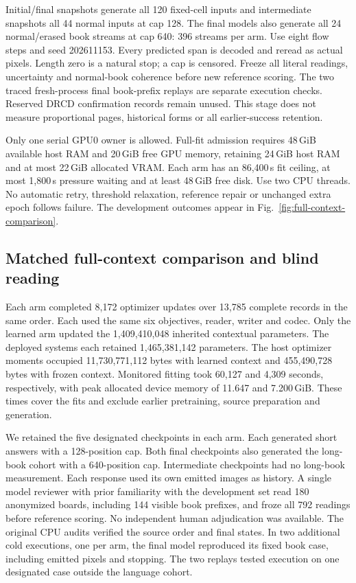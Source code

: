 \documentclass[12pt,a4paper]{article}
\providecommand{\DIFadd}[1]{{\protect\color{blue} \sf #1}} %
\begin{document}
\DIFadd{Initial/final snapshots generate all 120 fixed-cell inputs and intermediate
snapshots all 44 normal inputs at cap 128. The final models also generate all
24 normal/erased book streams at cap 640: 396 streams per arm. Use eight flow
steps and seed 202611153. Every predicted span is decoded and reread as actual
pixels. Length zero is a natural stop; a cap is censored. Freeze all literal
readings, uncertainty and normal-book coherence before new reference scoring.
The two traced fresh-process final book-prefix replays are separate execution
checks. Reserved DRCD confirmation records remain unused. This stage does not
measure proportional pages, historical forms or all earlier-success retention.
}

\DIFadd{Only one serial GPU0 owner is allowed. Full-fit admission requires 48\,GiB
available host RAM and 20\,GiB free GPU memory, retaining 24\,GiB host RAM and
at most 22\,GiB allocated VRAM. Each arm has an 86,400\,s fit ceiling, at most
1,800\,s pressure waiting and at least 48\,GiB free disk. Use two CPU threads.
No automatic retry, threshold relaxation, reference repair or unchanged extra
epoch follows failure. The development outcomes appear in Fig.~\ref{fig:full-context-comparison}.
}

\subsection*{\DIFadd{Matched full-context comparison and blind reading}}
\DIFadd{Each arm completed 8,172 optimizer updates over 13,785 complete records in
the same order. Each used the same six objectives, reader, writer and codec.
Only the learned arm updated the 1,409,410,048 inherited contextual parameters.
The deployed systems each retained 1,465,381,142 parameters. The host optimizer
moments occupied 11,730,771,112 bytes with learned context and 455,490,728 bytes
with frozen context. Monitored fitting took 60,127 and 4,309 seconds, respectively,
with peak allocated device memory of 11.647 and 7.200\,GiB. These times cover
the fits and exclude earlier pretraining, source preparation and generation.
}

\DIFadd{We retained the five designated checkpoints in each arm. Each generated short
answers with a 128-position cap. Both final checkpoints also generated the
long-book cohort with a 640-position cap. Intermediate checkpoints had no
long-book measurement. Each response used its own emitted images as history.
A single model reviewer with prior familiarity with the development set read
180 anonymized boards, including 144 visible book prefixes, and froze all 792
readings before reference scoring. No independent human adjudication was
available. The original CPU audits verified the source order and final states.
In two additional cold executions, one per arm, the final model reproduced its
fixed book case, including emitted pixels and stopping. The two replays tested
execution on one designated case outside the language cohort.
}
\end{document}
